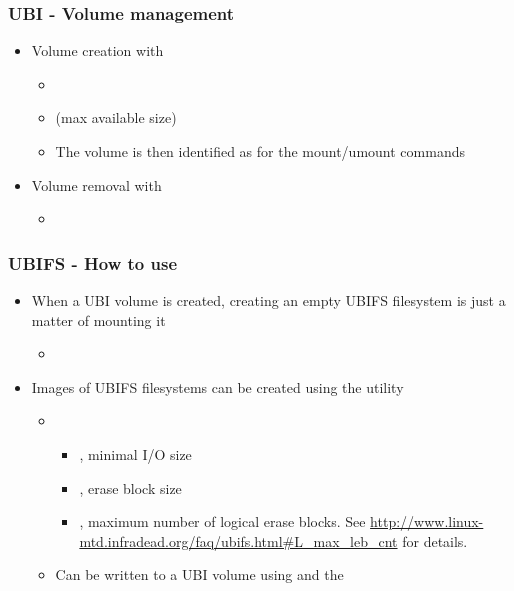 \begin{frame}
  \frametitle{UBI - Volume management}
  \begin{itemize}
  \item Volume creation with 
    \begin{itemize}
    \item {}
    \item {} (max available size)
    \item The volume is then identified as  for the
      mount/umount commands
    \end{itemize}
  \item Volume removal with 
    \begin{itemize}
    \item {}
    \end{itemize}
  \end{itemize}
\end{frame}

\begin{frame}
  \frametitle{UBIFS - How to use}
  \begin{itemize}
  \item When a UBI volume is created, creating an empty UBIFS
    filesystem is just a matter of mounting it
    \begin{itemize}
    \item {}
    \end{itemize}
  \item Images of UBIFS filesystems can be created using the
     utility
    \begin{itemize}
    \item {}
      \begin{itemize}
      \item {}, minimal I/O size
      \item {}, erase block size
      \item {}, maximum number of logical erase
        blocks. See
        \url{http://www.linux-mtd.infradead.org/faq/ubifs.html\#L_max_leb_cnt}
        for details.
      \end{itemize}
    \item Can be written to a UBI volume using  and
      the 
    \end{itemize}
  \end{itemize}
\end{frame}

